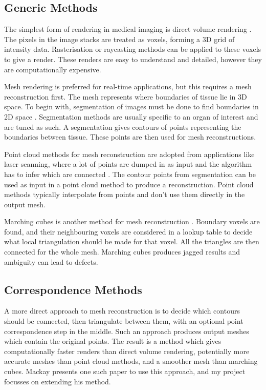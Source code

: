 \documentclass[10pt]{article}
\begin{document}
\subsection{Generic Methods}

The simplest form of rendering in medical imaging is direct volume rendering \cite{fishman2006volume}. The pixels in the image stacks are treated as voxels, forming a 3D grid of intensity data. Rasterisation or raycasting methods can be applied to these voxels to give a render. These renders are easy to understand and detailed, however they are computationally expensive.

Mesh rendering is preferred for real-time applications, but this requires a mesh reconstruction first. The mesh represents where boundaries of tissue lie in 3D space. To begin with, segmentation of images must be done to find boundaries in 2D space \cite{birkfellner2016applied}. Segmentation methods are usually specific to an organ of interest and are tuned as such. A segmentation gives contours of points representing the boundaries between tissue. These points are then used for mesh reconstructions.

Point cloud methods for mesh reconstruction are adopted from applications like laser scanning, where a lot of points are dumped in as input and the algorithm has to infer which are connected  \cite{oztireli2009feature}. The contour points from segmentation can be used as input in a point cloud method to produce a reconstruction. Point cloud methods typically interpolate from points and don't use them directly in the output mesh.

Marching cubes is another method for mesh reconstruction \cite{lorensen1987marching}. Boundary voxels are found, and their neighbouring voxels are considered in a lookup table to decide what local triangulation should be made for that voxel. All the triangles are then connected for the whole mesh. Marching cubes produces jagged results and ambiguity can lead to defects.

\subsection{Correspondence Methods}

A more direct approach to mesh reconstruction is to decide which contours should be connected, then triangulate between them, with an optional point correspondence step in the middle. Such an approach produces output meshes which contain the original points. The result is a method which gives computationally faster renders than direct volume rendering, potentially more accurate meshes than point cloud methods, and a smoother mesh than marching cubes. Mackay \cite{mackay2019robust} presents one such paper to use this approach, and my project focusses on extending his method.
\end{document}
